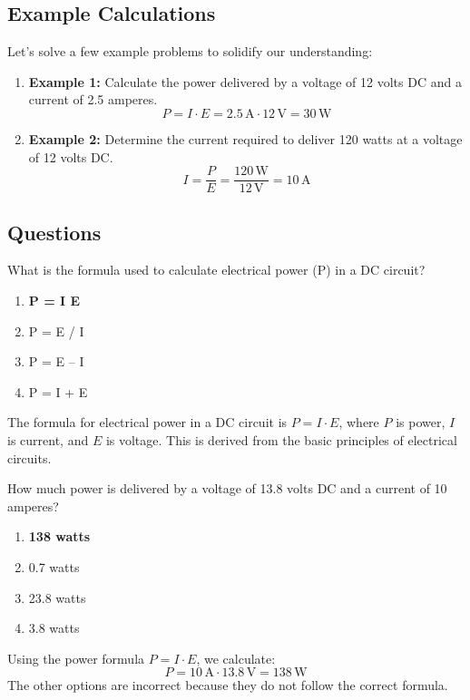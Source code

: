 \subsection*{Example Calculations}
Let's solve a few example problems to solidify our understanding:
\begin{enumerate}
    \item \textbf{Example 1:} Calculate the power delivered by a voltage of 12 volts DC and a current of 2.5 amperes.
    \[
    P = I \cdot E = 2.5 \, \text{A} \cdot 12 \, \text{V} = 30 \, \text{W}
    \]
    \item \textbf{Example 2:} Determine the current required to deliver 120 watts at a voltage of 12 volts DC.
    \[
    I = \frac{P}{E} = \frac{120 \, \text{W}}{12 \, \text{V}} = 10 \, \text{A}
    \]
\end{enumerate}

\subsection*{Questions}
\begin{tcolorbox}[colback=gray!10!white,colframe=black!75!black,title={T5C08}]
    What is the formula used to calculate electrical power (P) in a DC circuit?
    \begin{enumerate}[label=\Alph*),noitemsep]
        \item \textbf{P = I E}
        \item P = E / I
        \item P = E – I
        \item P = I + E
    \end{enumerate}
\end{tcolorbox}
The formula for electrical power in a DC circuit is \( P = I \cdot E \), where \( P \) is power, \( I \) is current, and \( E \) is voltage. This is derived from the basic principles of electrical circuits.


\begin{tcolorbox}[colback=gray!10!white,colframe=black!75!black,title={T5C09}]
    How much power is delivered by a voltage of 13.8 volts DC and a current of 10 amperes?
    \begin{enumerate}[label=\Alph*),noitemsep]
        \item \textbf{138 watts}
        \item 0.7 watts
        \item 23.8 watts
        \item 3.8 watts
    \end{enumerate}
\end{tcolorbox}
Using the power formula \( P = I \cdot E \), we calculate:
\[
P = 10 \, \text{A} \cdot 13.8 \, \text{V} = 138 \, \text{W}
\]
The other options are incorrect because they do not follow the correct formula.

